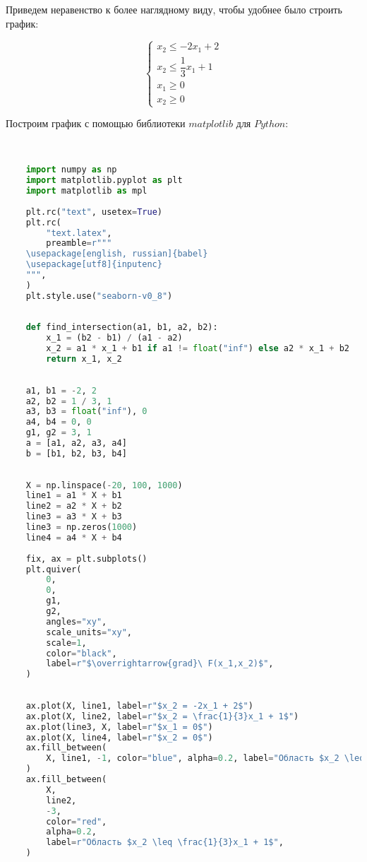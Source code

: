 Приведем неравенство к более наглядному виду, чтобы удобнее было строить график:

\[
    \begin{cases}
        x_2 \leq -2x_1 + 2\\
        x_2 \leq \dfrac{1}{3}x_1 + 1\\
        x_1 \geq 0\\
        x_2 \geq 0
    \end{cases}
\]

Построим график с помощью библиотеки $matplotlib$ для $Python$:\\ \\

\begin{lstlisting}[language=Python, label=code: 01-lab-01-code]
    
    import numpy as np
    import matplotlib.pyplot as plt
    import matplotlib as mpl
    
    plt.rc("text", usetex=True)
    plt.rc(
        "text.latex",
        preamble=r"""
    \usepackage[english, russian]{babel}
    \usepackage[utf8]{inputenc}
    """,
    )
    plt.style.use("seaborn-v0_8")
    
    
    def find_intersection(a1, b1, a2, b2):
        x_1 = (b2 - b1) / (a1 - a2)
        x_2 = a1 * x_1 + b1 if a1 != float("inf") else a2 * x_1 + b2
        return x_1, x_2
    
    
    a1, b1 = -2, 2
    a2, b2 = 1 / 3, 1
    a3, b3 = float("inf"), 0
    a4, b4 = 0, 0
    g1, g2 = 3, 1
    a = [a1, a2, a3, a4]
    b = [b1, b2, b3, b4]
    
    
    X = np.linspace(-20, 100, 1000)
    line1 = a1 * X + b1
    line2 = a2 * X + b2
    line3 = a3 * X + b3
    line3 = np.zeros(1000)
    line4 = a4 * X + b4
    
    fix, ax = plt.subplots()
    plt.quiver(
        0,
        0,
        g1,
        g2,
        angles="xy",
        scale_units="xy",
        scale=1,
        color="black",
        label=r"$\overrightarrow{grad}\ F(x_1,x_2)$",
    )
    
    
    ax.plot(X, line1, label=r"$x_2 = -2x_1 + 2$")
    ax.plot(X, line2, label=r"$x_2 = \frac{1}{3}x_1 + 1$")
    ax.plot(line3, X, label=r"$x_1 = 0$")
    ax.plot(X, line4, label=r"$x_2 = 0$")
    ax.fill_between(
        X, line1, -1, color="blue", alpha=0.2, label="Область $x_2 \leq -2x_1 + 2$"
    )
    ax.fill_between(
        X,
        line2,
        -3,
        color="red",
        alpha=0.2,
        label=r"Область $x_2 \leq \frac{1}{3}x_1 + 1$",
    )
    

\end{lstlisting}
